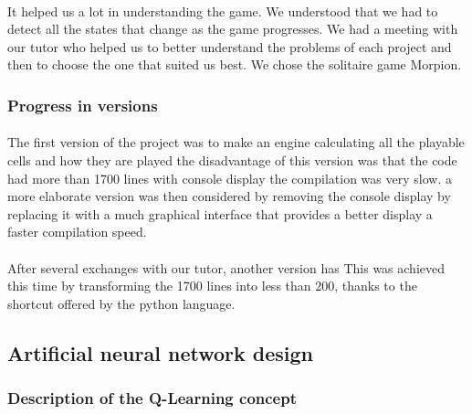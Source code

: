 \documentclass{article}
\begin{document}
\paragraph{}
\setlength{\parindent}{2cm}
It helped us a lot in understanding the game.  We understood that we had to detect all the states that change as the game progresses.  We had a meeting with our tutor who helped us to better understand the problems of each project and then to choose the one that suited us best. We chose the solitaire game Morpion.

\subsubsection{Progress in versions}
\paragraph{}
\setlength{\parindent}{2cm}
The first version of the project was to make an engine calculating all the playable cells and how they are played the disadvantage of this version was that the code had more than 1700 lines with console display the compilation was very slow. a more elaborate version was then considered by removing the console display by replacing it with a much graphical interface that provides a better display a faster compilation speed. 

\paragraph{}
\setlength{\parindent}{2cm}
 After several exchanges with our tutor, another version has
This was achieved this time by transforming the 1700 lines into less than 200, thanks to the shortcut offered by the python language.

\newpage
\subsection{Artificial neural network design}
\subsubsection{Description of the Q-Learning concept}
\end{document}
